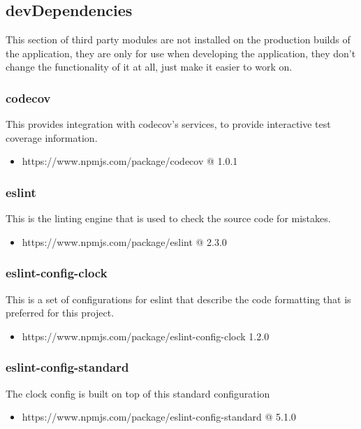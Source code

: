 \subsection{devDependencies}
  This section of third party modules are not installed on the production builds of the application, they are only for use when developing the application, they don't change the functionality of it at all, just make it easier to work on. 

  \subsubsection{codecov}
  This provides integration with codecov's services, to provide interactive test coverage information.
  \begin{itemize}
    \item https://www.npmjs.com/package/codecov @ 1.0.1
  \end{itemize}

  \subsubsection{eslint}
  This is the linting engine that is used to check the source code for mistakes.
  \begin{itemize}
    \item https://www.npmjs.com/package/eslint @ 2.3.0
  \end{itemize}

  \subsubsection{eslint-config-clock}
  This is a set of configurations for eslint that describe the code formatting that is preferred for this project.
  \begin{itemize}
    \item https://www.npmjs.com/package/eslint-config-clock 1.2.0
  \end{itemize}

  \subsubsection{eslint-config-standard}
  The clock config is built on top of this standard configuration
  \begin{itemize}
    \item https://www.npmjs.com/package/eslint-config-standard @ 5.1.0
  \end{itemize}

